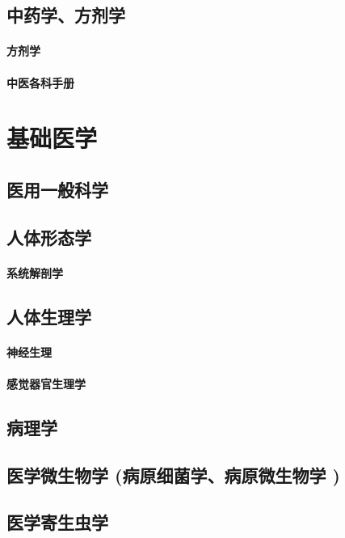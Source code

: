 \documentclass[UTF8]{../ApplicationUniverse}
\begin{document}
\section{中药学、方剂学}
    \subsubsection{方剂学}
    \subsubsection{中医各科手册}







\chapter{基础医学}
\section{医用一般科学}
\section{人体形态学}
    \subsubsection{系统解剖学}
\section{人体生理学}
    \subsubsection{神经生理}
    \subsubsection{感觉器官生理学}
\section{病理学}
\section{医学微生物学 (病原细菌学、病原微生物学 )}
\section{医学寄生虫学}
\end{document}
